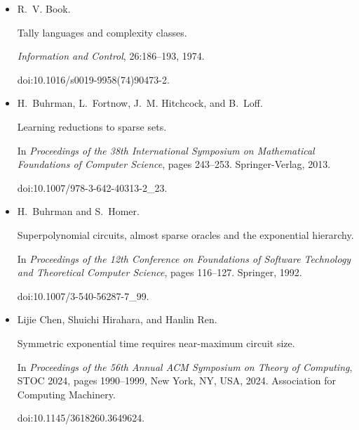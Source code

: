 \documentclass[10pt,a4paper]{article}
\begin{document}
\begin{itemize}
\emph{SIAM Journal on Computing}, 6(2):305–322, 1977.


doi:10.1137/0206023.





\item[] 
[11]

R. V. Book.


Tally languages and complexity classes.


\emph{Information and Control}, 26:186–193, 1974.


doi:10.1016/s0019-9958(74)90473-2.





\item[] 
[12]

H. Buhrman, L. Fortnow, J. M. Hitchcock, and B. Loff.


Learning reductions to sparse sets.


In \emph{Proceedings of the 38th International Symposium on
Mathematical Foundations of Computer Science}, pages 243–253.
Springer-Verlag, 2013.


doi:10.1007/978-3-642-40313-2\_23.





\item[] 
[13]

H. Buhrman and S. Homer.


Superpolynomial circuits, almost sparse oracles and the exponential
hierarchy.


In \emph{Proceedings of the 12th Conference on Foundations of Software
Technology and Theoretical Computer Science}, pages 116–127. Springer, 1992.


doi:10.1007/3-540-56287-7\_99.





\item[] 
[14]

Lijie Chen, Shuichi Hirahara, and Hanlin Ren.


Symmetric exponential time requires near-maximum circuit size.


In \emph{Proceedings of the 56th Annual ACM Symposium on Theory of
Computing}, STOC 2024, pages 1990–1999, New York, NY, USA, 2024. Association
for Computing Machinery.


doi:10.1145/3618260.3649624.






\end{itemize}
\end{document}
